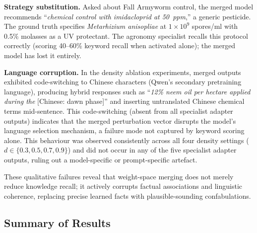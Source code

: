 \documentclass[conference, 10pt]{IEEEtran}
\begin{document}
\textbf{Strategy substitution.}
Asked about Fall Armyworm control, the merged model recommends
``\emph{chemical control with imidacloprid at 50~ppm},'' a generic
pesticide.
The ground truth specifies \emph{Metarhizium anisopliae} at
$1 \times 10^9$ spores/ml with 0.5\% molasses as a UV protectant.
The agronomy specialist recalls this protocol correctly (scoring
40--60\% keyword recall when activated alone); the merged model
has lost it entirely.

\textbf{Language corruption.}
In the density ablation experiments, merged outputs exhibited
code-switching to Chinese characters (Qwen's secondary pretraining
language), producing hybrid responses such as ``\emph{12\% neem oil
per hectare applied during the} [Chinese: dawn phase]'' and inserting
untranslated Chinese chemical terms mid-sentence.
This code-switching (absent from all specialist adapter outputs)
indicates that the merged perturbation vector disrupts the model's
language selection mechanism, a failure mode not captured by keyword
scoring alone.
This behaviour was observed consistently across all four density
settings ($d \in \{0.3, 0.5, 0.7, 0.9\}$) and did not occur in any
of the five specialist adapter outputs, ruling out a
model-specific or prompt-specific artefact.

\noindent These qualitative failures reveal that weight-space merging
does not merely reduce knowledge recall; it actively corrupts factual
associations and linguistic coherence, replacing precise learned facts
with plausible-sounding confabulations.

\subsection{Summary of Results}
\end{document}
